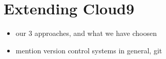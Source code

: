 \section{Extending Cloud9}
\label{sec:Approaches}
\begin{itemize}
	\item our 3 approaches, and what we have choosen
	\item mention version control systems in general, git
\end{itemize}
